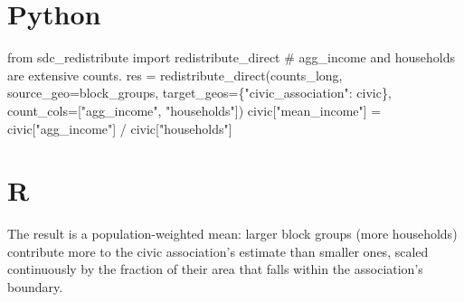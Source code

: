 \documentclass[
  letterpaper,
  DIV=11,
  numbers=noendperiod]{scrreprt}
\newenvironment{Shaded}{\begin{snugshade}}{\end{snugshade}}
\newcommand{\AttributeTok}[1]{\textcolor[rgb]{0.40,0.45,0.13}{#1}}
\newcommand{\CommentTok}[1]{\textcolor[rgb]{0.37,0.37,0.37}{#1}}
\newcommand{\FunctionTok}[1]{\textcolor[rgb]{0.28,0.35,0.67}{#1}}
\newcommand{\ImportTok}[1]{\textcolor[rgb]{0.00,0.46,0.62}{#1}}
\newcommand{\NormalTok}[1]{\textcolor[rgb]{0.00,0.23,0.31}{#1}}
\newcommand{\OperatorTok}[1]{\textcolor[rgb]{0.37,0.37,0.37}{#1}}
\newcommand{\OtherTok}[1]{\textcolor[rgb]{0.00,0.23,0.31}{#1}}
\newcommand{\SpecialCharTok}[1]{\textcolor[rgb]{0.37,0.37,0.37}{#1}}
\newcommand{\StringTok}[1]{\textcolor[rgb]{0.13,0.47,0.30}{#1}}
\begin{document}
\section{Python}

\begin{Shaded}
\begin{Highlighting}[]
\ImportTok{from}\NormalTok{ sdc\_redistribute }\ImportTok{import}\NormalTok{ redistribute\_direct}
\CommentTok{\# agg\_income and households are extensive counts.}
\NormalTok{res }\OperatorTok{=}\NormalTok{ redistribute\_direct(counts\_long, source\_geo}\OperatorTok{=}\NormalTok{block\_groups,}
\NormalTok{                          target\_geos}\OperatorTok{=}\NormalTok{\{}\StringTok{"civic\_association"}\NormalTok{: civic\}, count\_cols}\OperatorTok{=}\NormalTok{[}\StringTok{"agg\_income"}\NormalTok{, }\StringTok{"households"}\NormalTok{])}
\NormalTok{civic[}\StringTok{"mean\_income"}\NormalTok{] }\OperatorTok{=}\NormalTok{ civic[}\StringTok{"agg\_income"}\NormalTok{] }\OperatorTok{/}\NormalTok{ civic[}\StringTok{"households"}\NormalTok{]}
\end{Highlighting}
\end{Shaded}

\section{R}

\begin{Shaded}
\end{Shaded}

The result is a population-weighted mean: larger block groups (more
households) contribute more to the civic association's estimate than
smaller ones, scaled continuously by the fraction of their area that
falls within the association's boundary.
\end{document}
